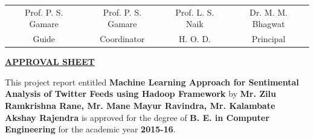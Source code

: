 \documentclass[a4paper,12pt]{report}
\begin{document}
\vspace{20mm}
\begin{center}
{\centering
\begin{tabular}{cccc}
Prof. P. S. Gamare\hspace{7mm}&\hspace{7mm}Prof. P. S. Gamare\hspace{7mm}&\hspace{10mm}Prof. L. S. Naik\hspace{7mm}&\hspace{7mm}Dr. M. M. Bhagwat\\
Guide\hspace{10mm}&\hspace{10mm}Coordinator\hspace{10mm}&\hspace{10mm}H. O. D.\hspace{10mm}&\hspace{10mm} Principal
\end{tabular}}
\end{center}
\newpage
\thisfancypage{%
\setlength{\fboxsep}{12pt}\doublebox}{}
\begin{center}
{\huge \bf \underline{APPROVAL SHEET}}
\end{center}
\vspace{10mm}
\hspace{12mm}This project report entitled {\bf Machine Learning Approach for Sentimental Analysis
of Twitter Feeds using Hadoop Framework} by {\bf Mr. Zilu Ramkrishna Rane, Mr. Mane Mayur Ravindra, Mr. Kalambate Akshay Rajendra} is approved for the degree of {\bf B. E. in Computer Engineering} for the academic year {\bf2015-16}.\\
\end{document}
